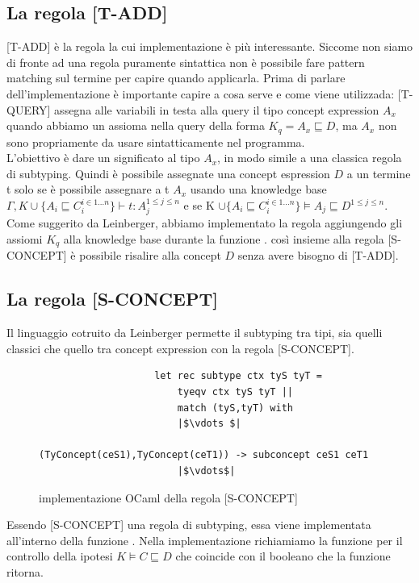             \subsection{La regola [T-ADD]}
            [T-ADD] è la regola la cui implementazione è più interessante. Siccome non siamo di fronte ad una regola puramente sintattica
            non è possibile fare pattern matching sul termine per capire quando applicarla.
            Prima di parlare dell'implementazione è importante capire a cosa serve e come viene utilizzada: [T-QUERY] assegna alle variabili in testa alla query
            il tipo concept expression $A_x$ quando abbiamo un assioma nella query della forma $K_q = A_x \sqsubseteq D$, ma $A_x$ non sono propriamente da usare sintatticamente nel programma.
            \\L'obiettivo è dare un significato al tipo $A_x$, in modo simile a una classica regola di subtyping. Quindi è possibile assegnate una concept espression $D$
            a un termine t solo se è possibile assegnare a t $A_x$ usando una knowledge base $\Gamma,K \cup \{A_i \sqsubseteq C_i^{i \in 1...n}\} \vdash t : A_j^{1 \leq j \leq n}$
            e se K $\cup \{A_i \sqsubseteq C_i^{i \in 1...n}\} \vDash A_j \sqsubseteq D^{1 \leq j \leq n}$.
            \\Come suggerito da Leinberger, abbiamo implementato la regola aggiungendo gli assiomi $K_q$ alla knowledge base durante la funzione .
            così insieme alla regola {[S-CONCEPT]} è possibile risalire alla concept $D$ senza avere bisogno di [T-ADD].
            \subsection{La regola [S-CONCEPT]}
            Il linguaggio cotruito da Leinberger permette il subtyping tra tipi, sia quelli classici che quello tra concept expression con la regola [S-CONCEPT].
            \begin{figure}[h]
                \begin{verbatim}
                    let rec subtype ctx tyS tyT =
                        tyeqv ctx tyS tyT ||
                        match (tyS,tyT) with
                        |$\vdots $|
                            (TyConcept(ceS1),TyConcept(ceT1)) -> subconcept ceS1 ceT1
                        |$\vdots$|
                \end{verbatim}
            \caption{implementazione OCaml della regola [S-CONCEPT]}
            \end{figure}
            Essendo [S-CONCEPT] una regola di subtyping, essa viene implementata all'interno della funzione . Nella implementazione richiamiamo la funzione 
             per il controllo della ipotesi $K \vDash C \sqsubseteq D$ che coincide con il booleano che la funzione ritorna. 












        
        